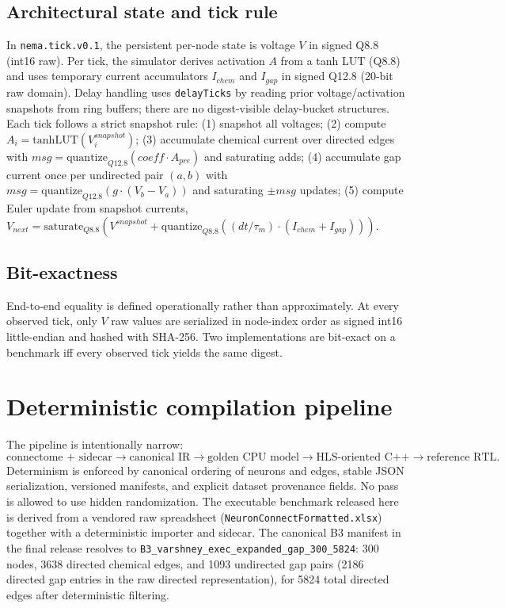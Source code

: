 \documentclass[11pt]{article}
\begin{document}
\subsection{Architectural state and tick rule}
In \texttt{nema.tick.v0.1}, the persistent per-node state is voltage $V$ in signed Q8.8 (int16 raw). Per tick, the simulator derives activation $A$ from a tanh LUT (Q8.8) and uses temporary current accumulators $I_{chem}$ and $I_{gap}$ in signed Q12.8 (20-bit raw domain). Delay handling uses \texttt{delayTicks} by reading prior voltage/activation snapshots from ring buffers; there are no digest-visible delay-bucket structures. Each tick follows a strict snapshot rule: (1) snapshot all voltages; (2) compute $A_i=\mathrm{tanhLUT}(V^{snapshot}_i)$; (3) accumulate chemical current over directed edges with $msg=\mathrm{quantize}_{Q12.8}(coeff\cdot A_{pre})$ and saturating adds; (4) accumulate gap current once per undirected pair $(a,b)$ with $msg=\mathrm{quantize}_{Q12.8}(g\cdot(V_b-V_a))$ and saturating $\pm msg$ updates; (5) compute Euler update from snapshot currents, $V_{next}=\mathrm{saturate}_{Q8.8}(V^{snapshot}+\mathrm{quantize}_{Q8.8}((dt/\tau_m)\cdot(I_{chem}+I_{gap})))$.

\subsection{Bit-exactness}
End-to-end equality is defined operationally rather than approximately. At every observed tick, only $V$ raw values are serialized in node-index order as signed int16 little-endian and hashed with SHA-256. Two implementations are bit-exact on a benchmark iff every observed tick yields the same digest.

\section{Deterministic compilation pipeline}
The pipeline is intentionally narrow:
\[
\text{connectome + sidecar} \rightarrow \text{canonical IR} \rightarrow \text{golden CPU model} \rightarrow \text{HLS-oriented C++} \rightarrow \text{reference RTL}.
\]
Determinism is enforced by canonical ordering of neurons and edges, stable JSON serialization, versioned manifests, and explicit dataset provenance fields. No pass is allowed to use hidden randomization. The executable benchmark released here is derived from a vendored raw spreadsheet (\texttt{NeuronConnectFormatted.xlsx}) together with a deterministic importer and sidecar. The canonical B3 manifest in the final release resolves to \texttt{B3\_varshney\_exec\_expanded\_gap\_300\_5824}: 300 nodes, 3638 directed chemical edges, and 1093 undirected gap pairs (2186 directed gap entries in the raw directed representation), for 5824 total directed edges after deterministic filtering.
\end{document}
